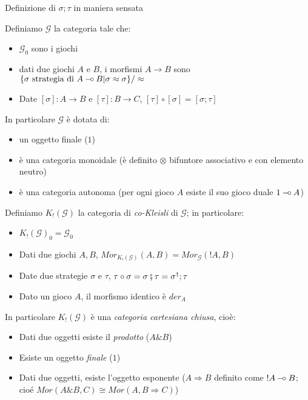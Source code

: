 \documentclass{beamer}
\newcommand{\limp}{\mathbin{{-}\mkern-3.5mu{\circ}}}
\begin{document}
\begin{frame}
	
	Definizione di $\sigma ; \tau$ in maniera sensata
	
	Definiamo $\mathcal{G}$ la categoria tale che:
	\begin{itemize}
		\item $\mathcal{G}_0$ sono i giochi
		\item dati due giochi $A$ e $B$, i morfismi $A\rightarrow B$ sono $\{ \sigma \text{ strategia di } A\limp B | \sigma \approx \sigma \} / \approx$
		\item Date $[\sigma] : A\rightarrow B$ e $[\tau] : B \rightarrow C$, $[\tau] \circ [\sigma] = [\sigma ; \tau]$
	\end{itemize}
	
	In particolare $\mathcal{G}$ è dotata di:
	\begin{itemize}
		\item un oggetto finale ($1$)
		\item è una categoria monoidale (è definito $\otimes$ bifuntore associativo e con elemento neutro)
		\item è una categoria autonoma (per ogni gioco $A$ esiste il suo gioco duale $1 \limp A$)
	\end{itemize}
	
\end{frame}


\begin{frame}

	Definiamo $K_!(\mathcal{G})$ la categoria di \emph{co-Kleisli} di $\mathcal{G}$; in particolare:
	\begin{itemize}
		\item $K_!(\mathcal{G})_0 = \mathcal{G}_0$
		\item Dati due giochi $A,B$, $Mor_{K_!(\mathcal{G})}(A,B) = Mor_{\mathcal{G}}(!A,B)$
		\item Date due strategie $\sigma$ e $\tau$, $\tau \circ \sigma = \sigma \fatsemi \tau = \sigma ^\dag ; \tau$
		\item Dato un gioco $A$, il morfismo identico è $der_A$
	\end{itemize}

	In particolare $K_!(\mathcal{G})$ è una \emph{categoria cartesiana chiusa}, cioè:
	\begin{itemize}
		\item Dati due oggetti esiste il \emph{prodotto} ($A\& B$)
		\item Esiste un oggetto \emph{finale} ($1$)
		\item Dati due oggetti, esiste l'oggetto esponente ($A \Rightarrow B$ definito come $!A \limp B$; cioé $Mor(A\& B,C) \cong Mor(A,B\Rightarrow C)$)
	\end{itemize}


\end{frame}
\end{document}
